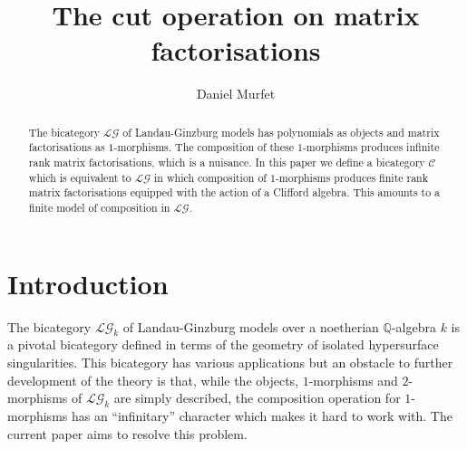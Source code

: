 \documentclass[english,letter paper,12pt,leqno]{article}
\theoremstyle{example}
\numberwithin{equation}{section}
\def\res{\operatorname{Res}}
\def\LG{\mathcal{LG}}
\def\L{\mathcal{C}}
\begin{document}
\def\Res{\res\!}
\newcommand{\ud}{\mathrm{d}}
\newcommand{\Ress}[1]{\res_{#1}\!}
\newcommand{\cat}[1]{\mathcal{#1}}
\newcommand{\lto}{\longrightarrow}
\newcommand{\xlto}[1]{\stackrel{#1}\lto}
\newcommand{\mf}[1]{\mathfrak{#1}}
\newcommand{\md}[1]{\mathscr{#1}}
\def\sus{\l}
\def\l{\,|\,}
\def\sgn{\textup{sgn}}

\title{The cut operation on matrix factorisations}
\author{Daniel Murfet}


\maketitle

\begin{abstract}
The bicategory $\LG$ of Landau-Ginzburg models has polynomials as objects and matrix factorisations as $1$-morphisms. The composition of these $1$-morphisms produces infinite rank matrix factorisations, which is a nuisance. In this paper we define a bicategory $\L$ which is equivalent to $\LG$ in which composition of $1$-morphisms produces finite rank matrix factorisations equipped with the action of a Clifford algebra. This amounts to a finite model of composition in $\LG$.
\end{abstract}

\tableofcontents

\section{Introduction}

The bicategory $\LG_k$ of Landau-Ginzburg models \cite{lgdual} over a noetherian $\mathbb{Q}$-algebra $k$ is a pivotal bicategory defined in terms of the geometry of isolated hypersurface singularities. This bicategory has various applications \cite{genorb,ade, kr0401268} but an obstacle to further development of the theory is that, while the objects, $1$-morphisms and $2$-morphisms of $\LG_k$ are simply described, the composition operation for $1$-morphisms has an ``infinitary'' character which makes it hard to work with. The current paper aims to resolve this problem. %
\end{document}
